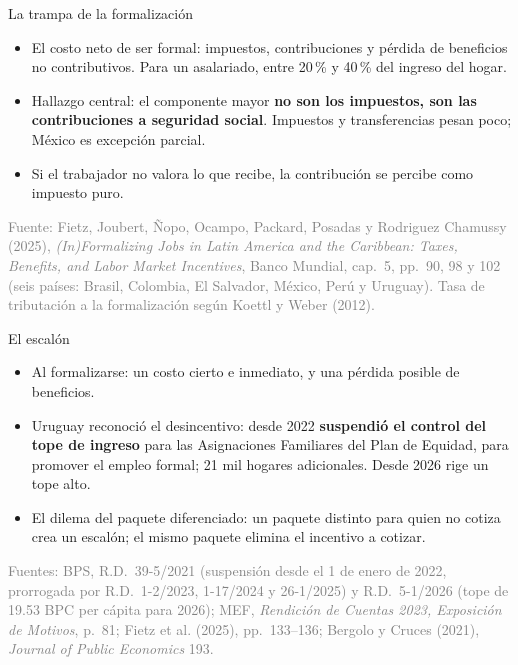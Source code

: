 \documentclass[aspectratio=169,11pt]{beamer}
\newcommand{\clave}[1]{\textcolor{acento}{\textbf{#1}}}
\newcommand{\pie}[1]{\vfill{\scriptsize\textcolor{gray}{#1}}}
\begin{document}
\begin{frame}{La trampa de la formalización}
  \begin{itemize}
    \item El costo neto de ser formal: impuestos, contribuciones y pérdida de beneficios no contributivos. Para un asalariado, entre 20\,\% y 40\,\% del ingreso del hogar.
    \item Hallazgo central: el componente mayor \clave{no son los impuestos, son las contribuciones a seguridad social}. Impuestos y transferencias pesan poco; México es excepción parcial.
    \item Si el trabajador no valora lo que recibe, la contribución se percibe como impuesto puro.
  \end{itemize}
  \pie{Fuente: Fietz, Joubert, Ñopo, Ocampo, Packard, Posadas y Rodriguez Chamussy (2025), \emph{(In)Formalizing Jobs in Latin America and the Caribbean: Taxes, Benefits, and Labor Market Incentives}, Banco Mundial, cap.~5, pp.~90, 98 y 102 (seis países: Brasil, Colombia, El Salvador, México, Perú y Uruguay). Tasa de tributación a la formalización según Koettl y Weber (2012).}
\end{frame}

\begin{frame}{El escalón}
  \begin{itemize}
    \item Al formalizarse: un costo cierto e inmediato, y una pérdida posible de beneficios.
    \item Uruguay reconoció el desincentivo: desde 2022 \clave{suspendió el control del tope de ingreso} para las Asignaciones Familiares del Plan de Equidad, para promover el empleo formal; 21 mil hogares adicionales. Desde 2026 rige un tope alto.
    \item El dilema del paquete diferenciado: un paquete distinto para quien no cotiza crea un escalón; el mismo paquete elimina el incentivo a cotizar.
  \end{itemize}
  \pie{Fuentes: BPS, R.D.~39-5/2021 (suspensión desde el 1 de enero de 2022, prorrogada por R.D.~1-2/2023, 1-17/2024 y 26-1/2025) y R.D.~5-1/2026 (tope de 19.53 BPC per cápita para 2026); MEF, \emph{Rendición de Cuentas 2023, Exposición de Motivos}, p.~81; Fietz et al. (2025), pp.~133--136; Bergolo y Cruces (2021), \emph{Journal of Public Economics} 193.}
\end{frame}

\end{document}
